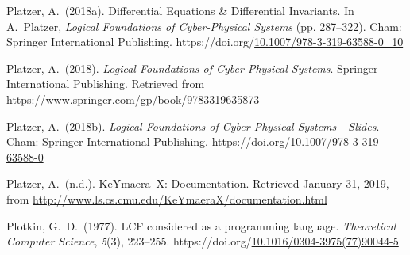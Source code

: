 \documentclass[12pt,twoside]{article}
\begin{document}
{\begin{thebibliography}{1079}
\mdbibitemlabel{}Platzer, A.~(2018a). Differential Equations \& Differential Invariants. In A.~Platzer, \emph{Logical Foundations of Cyber-Physical Systems} (pp. 287–322). Cham: Springer International Publishing. https://doi.org/\href{https://dx.doi.org/10.1007/978-3-319-63588-0_10}{10.1007/978-3-319-63588-0\_10}%

\mdbibitemlabel{}Platzer, A.~(2018). \emph{Logical Foundations of Cyber-Physical Systems}. Springer International Publishing. Retrieved from \href{https://www.springer.com/gp/book/9783319635873}{{\ttfamily https://\hspace{0pt}www.\hspace{0pt}springer.\hspace{0pt}com/\hspace{0pt}gp/\hspace{0pt}book/\hspace{0pt}9783319635873}}%

\mdbibitemlabel{}Platzer, A.~(2018b). \emph{Logical Foundations of Cyber-Physical Systems - Slides}. Cham: Springer International Publishing. https://doi.org/\href{https://dx.doi.org/10.1007/978-3-319-63588-0}{10.1007/978-3-319-63588-0}%

\mdbibitemlabel{}Platzer, A.~(n.d.). KeYmaera X: Documentation. Retrieved January 31, 2019, from \href{http://www.ls.cs.cmu.edu/KeYmaeraX/documentation.html}{{\ttfamily http://\hspace{0pt}www.\hspace{0pt}ls.\hspace{0pt}cs.\hspace{0pt}cmu.\hspace{0pt}edu/\hspace{0pt}KeYmaeraX/\hspace{0pt}documentation.\hspace{0pt}html}}%

\mdbibitemlabel{}Plotkin, G.~D.~(1977). LCF considered as a programming language. \emph{Theoretical Computer Science}, \emph{5}(3), 223–255. https://doi.org/\href{https://dx.doi.org/10.1016/0304-3975\%252877\%252990044-5}{10.1016/0304-3975(77)90044-5}%


\end{thebibliography}}
\end{document}
